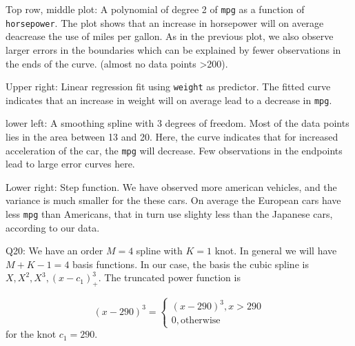\documentclass[]{article}
\begin{document}
Top row, middle plot: A polynomial of degree 2 of \texttt{mpg} as a
function of \texttt{horsepower}. The plot shows that an increase in
horsepower will on average deacrease the use of miles per gallon. As in
the previous plot, we also observe larger errors in the boundaries which
can be explained by fewer observations in the ends of the curve. (almost
no data points \textgreater{}200).

Upper right: Linear regression fit using \texttt{weight} as predictor.
The fitted curve indicates that an increase in weight will on average
lead to a decrease in \texttt{mpg}.

lower left: A smoothing spline with 3 degrees of freedom. Most of the
data points lies in the area between 13 and 20. Here, the curve
indicates that for increased acceleration of the car, the \texttt{mpg}
will decrease. Few observations in the endpoints lead to large error
curves here.

Lower right: Step function. We have observed more american vehicles, and
the variance is much smaller for the these cars. On average the European
cars have less \texttt{mpg} than Americans, that in turn use slighty
less than the Japanese cars, according to our data.

Q20: We have an order \(M=4\) spline with \(K=1\) knot. In general we
will have \(M+K-1=4\) basis functions. In our case, the basis the cubic
spline is \(X,X^2,X^3,(x-c_1)_+^3\). The truncated power function is

\[
(x-290)^3= \begin{cases}(x-290)^3, x>290 \\
0, \text{otherwise}
\end{cases}
\] for the knot \(c_1=290\).
\end{document}

